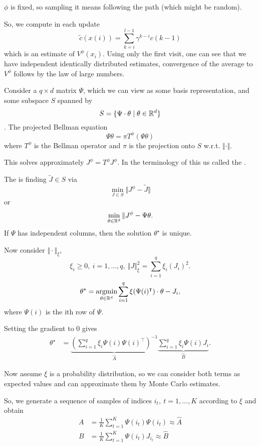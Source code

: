 \begin{remark}
    \(\phi\) is fixed, so sampling it means following the path (which might be random).
\end{remark}

So, we compute in each update 
\[\tilde{c}(x(i))=\sum_{k=i}^{l-1}\gamma^{k-i}c(k-1)\]
which is an estimate of \(V^\phi(x_i)\). Using only the first visit, one can see that 
we have independent identically distributed estimates, convergence of 
the average to \(V^\phi\) follows by the law of large numbers.  

Consider a \(q\times d\) matrix \(\Psi\), which we can view as some basis representation,
and some subspace \(S\) spanned by \[S=\{\Psi\cdot \theta\mid \theta\in\mathbb{R}^d\}\].
The projected Bellman equation 
\[\Psi\theta=\pi T^\phi(\Psi\theta)\]
where \(T^\phi\) is the Bellman operator and \(\pi\) is the projection onto \(S\) w.r.t. \(\Vert \cdot \Vert\).

This solves approximately \(J^\phi=T^\phi J^\phi\). In the terminology of \cite{Bertsekas2000} 
this us called the .

The  is finding \(\tilde{J}\in S\) via 
\[\min_{J\in S} \Vert J^\phi-\tilde{J}\Vert\]
or 
\[\min_{\theta\in\mathbb{R}^d}\Vert J^\phi-\Psi \theta.\]
If \(\Psi\) has independent columns, then the solution \(\theta^\star\)
is unique. 

Now consider \(\Vert \cdot\Vert_\xi\), 
\[\xi_i\geq 0,\ i=1,\dots,q,\ \Vert J\Vert_\xi^2=\sum_{i=1}^q \xi_i(J_i)^2.\]
\[\theta^\star=\operatorname*{\text{argmin}}_{\theta\in\mathbb{R}^d}\sum_{i=1}^q \xi(\Psi(i)^\intercal)\cdot \theta-J_i,\]
where \(\Psi(i)\) is the ith row of \(\Psi\). 

Setting the gradient to \(0\) gives 
\begin{align*}
    \theta^\star&=\underbrace{\left(\sum_{i=1}^q \xi_i\Psi(i)\Psi(i)^\intercal\right)^{-1}}_{\hat{A}}\underbrace{\sum_{i=1}^q \xi_i\Psi(i)J_i}_{\hat{B}}. 
\end{align*}

Now assume \(\xi\) is a probability distribution, so we can consider both terms as 
expected values and can approximate them by Monte Carlo estimates.

So, we generate a sequence of samples of indices \(i_t,\ t=1,\dots, K\)
according to \(\xi\) and obtain 
\begin{align*}
    A&=\frac{1}{K}\sum_{t=1}^K\Psi(i_t)\Psi(i_t)\approx \hat{A}\\
    B&=\frac{1}{K}\sum_{t=1}^K \Psi(i_t)J_{i_t}\approx \hat{B}
\end{align*} 

